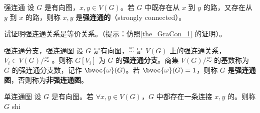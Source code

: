 \begin{definition}{强连通}
设 $G$ 是有向图，$x,y\in V(G)$。若 $G$ 中既存在从 $x$ 到 $y$ 的路，又存在从 $y$ 到 $x$ 的路，则称 $x,y$ 是\textbf{强连通的}（strongly connected）。
\end{definition}

\begin{exercise}{}
试证明强连通关系是等价关系。（提示：仿照\autoref{the_GraCon_1} 的证明）。
\end{exercise}

\begin{definition}{强连通分支，强连通图}
设 $G$ 是有向图，$\overset{sc}{\sim}$ 是 $V(G)$ 上的强连通关系，$V_i\in V(G)/\overset{sc}{\sim}$ 。则称 $G[V_i]$ 为 $G$ 的\textbf{强连通分支}。商集 $V(G)/\overset{sc}{\sim}$ 的基数称为 $G$ 的强连通分支数，记作 $\bvec{\omega}(G)$。若 $\bvec{\omega}(G)=1$，则称 $G$ 是\textbf{强连通图}，否则称为\textbf{非强连通图}。
\end{definition}

\begin{definition}{单连通图}
设 $G$ 是有向图。若 $\forall x,y\in V(G)$，$G$ 中都存在一条连接 $x,y$ 的。则称 $G$ shi
\end{definition}










